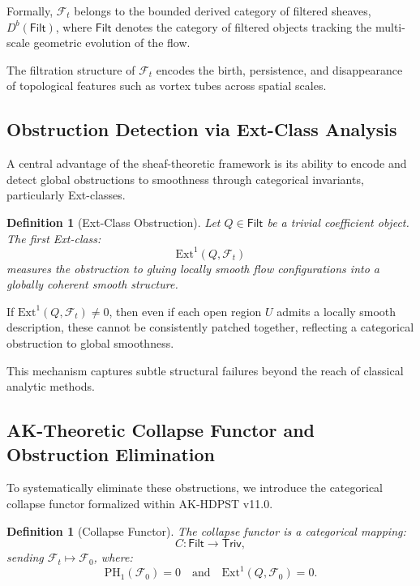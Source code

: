 \documentclass[11pt]{article}
\newtheorem{definition}[theorem]{Definition}
\begin{document}
Formally, \( \mathcal{F}_t \) belongs to the bounded derived category of filtered sheaves, \( D^b(\mathsf{Filt}) \), where \( \mathsf{Filt} \) denotes the category of filtered objects tracking the multi-scale geometric evolution of the flow.

The filtration structure of \( \mathcal{F}_t \) encodes the birth, persistence, and disappearance of topological features such as vortex tubes across spatial scales.

\subsection{Obstruction Detection via Ext-Class Analysis}

A central advantage of the sheaf-theoretic framework is its ability to encode and detect global obstructions to smoothness through categorical invariants, particularly Ext-classes.

\begin{definition}[Ext-Class Obstruction]
Let \( Q \in \mathsf{Filt} \) be a trivial coefficient object. The first Ext-class:
\[
\mathrm{Ext}^1(Q, \mathcal{F}_t)
\]
measures the obstruction to gluing locally smooth flow configurations into a globally coherent smooth structure.
\end{definition}

If \( \mathrm{Ext}^1(Q, \mathcal{F}_t) \neq 0 \), then even if each open region \( U \) admits a locally smooth description, these cannot be consistently patched together, reflecting a categorical obstruction to global smoothness.

This mechanism captures subtle structural failures beyond the reach of classical analytic methods.

\subsection{AK-Theoretic Collapse Functor and Obstruction Elimination}

To systematically eliminate these obstructions, we introduce the categorical collapse functor formalized within AK-HDPST v11.0.

\begin{definition}[Collapse Functor]
The collapse functor is a categorical mapping:
\[
C : \mathsf{Filt} \longrightarrow \mathsf{Triv},
\]
sending \( \mathcal{F}_t \mapsto \mathcal{F}_0 \), where:
\[
\mathrm{PH}_1(\mathcal{F}_0) = 0 \quad \text{and} \quad \mathrm{Ext}^1(Q, \mathcal{F}_0) = 0.
\]
\end{definition}
\end{document}
